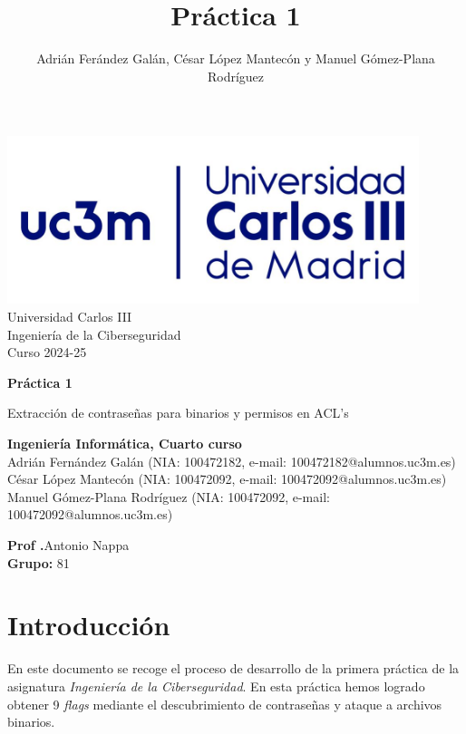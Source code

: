 \documentclass[]{article}
\title{Práctica 1}
\author{Adrián Ferández Galán, César López Mantecón y Manuel Gómez-Plana Rodríguez}
\begin{document}
\begin{titlepage}
    \centering
   \includegraphics[width=0.9\textwidth]{uc3m.jpg} 
    {\Huge Universidad Carlos III\\
    
     \Large Ingeniería de la Ciberseguridad\\
     \vspace{0.5cm}
     Curso 2024-25}
    \vspace{2cm}

    {\Huge \textbf{Práctica 1} \par}
    \vspace{0.5cm}
    {\Large Extracción de contraseñas para binarios y permisos en ACL's\par}
    \vspace{8cm}

   \textbf{Ingeniería Informática, Cuarto curso}\\
    \vspace{0.2cm} 
    Adrián Fernández Galán       (NIA: 100472182, e-mail: 100472182@alumnos.uc3m.es)\\
    César López Mantecón         (NIA: 100472092, e-mail: 100472092@alumnos.uc3m.es)\\
    Manuel Gómez-Plana Rodríguez (NIA: 100472092, e-mail: 100472092@alumnos.uc3m.es)
    \vspace{0.5cm}

   
    \textbf{Prof .}Antonio Nappa\\
    
    \textbf{Grupo: } 81   
    
\end{titlepage}
\newpage

\renewcommand{\contentsname}{\centering Índice}
\tableofcontents

\newpage

\section{Introducción}
\label{sec:introduccion}
En este documento se recoge el proceso de desarrollo de la primera práctica de la asignatura \textit{Ingeniería de la Ciberseguridad}. En esta práctica hemos logrado obtener 9 \textit{flags} mediante el descubrimiento de contraseñas y ataque a archivos binarios. 
\end{document}
